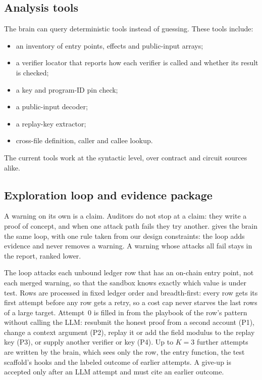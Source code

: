\subsection{Analysis tools}\label{sec:design-tools}

The brain can query deterministic tools instead of guessing. These tools
include:
\begin{itemize}
\item an inventory of entry points, effects and public-input arrays;
\item a verifier locator that reports how each verifier is called and whether
its result is checked;
\item a key and program-ID pin check;
\item a public-input decoder;
\item a replay-key extractor;
\item cross-file definition, caller and callee lookup.
\end{itemize}
The current tools work at the syntactic level, over contract and circuit
sources alike.

\subsection{Exploration loop and evidence package}\label{sec:design-explore}
A warning on its own is a claim. Auditors do not stop at a claim: they write a
proof of concept, and when one attack path fails they try another. \tool{}
gives the brain the same loop, with one rule taken from our design
constraints: the loop adds evidence and never removes a warning. A warning
whose attacks all fail stays in the report, ranked lower.

The loop attacks each unbound ledger row that has an on-chain entry point,
not each merged warning, so that the sandbox knows exactly which value is
under test. Rows are processed in fixed ledger order and breadth-first:
every row gets its first attempt before any row gets a retry, so a cost cap
never starves the last rows of a large target. Attempt~0 is filled in from
the playbook of the row's pattern without calling the LLM: resubmit the
honest proof from a second account (P1), change a context argument (P2),
replay it or add the field modulus to the replay key (P3), or supply another
verifier or key (P4). Up to $K=3$ further attempts are written by the brain,
which sees only the row, the entry function, the test scaffold's hooks and
the labeled outcome of earlier attempts. A give-up is accepted only after an
LLM attempt and must cite an earlier outcome.

